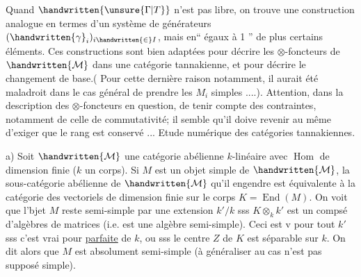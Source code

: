 Quand $\handwritten{\unsure{\Gamma|T}}$ n'est pas libre, on trouve une construction analogue en termes d'un système de générateurs $(\handwritten{\gamma}_i)_{i\handwritten{\in}I}$, mais en``  égaux à 1 '' de plus certains éléments. Ces constructions sont bien adaptées pour décrire les $\otimes$-foncteurs de $\handwritten{\mathcal{M}}$ dans une \deleted{$\otimes$-}catégorie tannakienne, et pour décrire le changement de base.( Pour cette dernière raison notamment, il aurait été maladroit dans le cas général de prendre les $M_i$ simples ....). Attention, dans la description des $\otimes$-foncteurs en question, de tenir compte des contraintes, notamment de celle de commutativité; il semble qu'il doive revenir au même d'exiger que le rang est conservé ...
Etude numérique des catégories tannakiennes.

a) Soit $\handwritten{\mathcal{M}}$ une catégorie abélienne $k$-linéaire avec $\operatorname{Hom}$ de dimension finie ($k$ un corps). Si $M$ est un objet simple de $\handwritten{\mathcal{M}}$, la sous-catégorie abélienne de $\handwritten{\mathcal{M}}$ qu'il engendre est équivalente à la catégorie des vectoriels de dimension finie sur le corps $K=\operatorname{End}(M)$. On voit  que l'bjet $M$ reste semi-simple par une extension $k'/k$ sss $K\otimes_k k'$ est un compsé  d'algèbres de matrices (i.e. est une algèbre semi-simple). Ceci est v pour tout $k'$ sss c'est vrai pour  \uline{parfaite} de $k$, ou sss le centre  $Z$ de $K$ est séparable sur $k$. On dit alors que $M$ est absolument semi-simple (à généraliser au cas n'est pas supposé simple).

